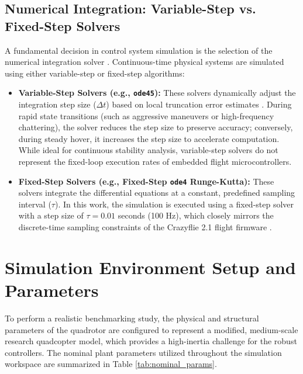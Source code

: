 \subsection{Numerical Integration: Variable-Step vs. Fixed-Step Solvers}
A fundamental decision in control system simulation is the selection of the numerical integration solver \cite{ref_83}. Continuous-time physical systems are simulated using either variable-step or fixed-step algorithms:
\begin{itemize}
    \item \textbf{Variable-Step Solvers (e.g., \texttt{ode45}):} These solvers dynamically adjust the integration step size ($\Delta t$) based on local truncation error estimates \cite{ref_83}. During rapid state transitions (such as aggressive maneuvers or high-frequency chattering), the solver reduces the step size to preserve accuracy; conversely, during steady hover, it increases the step size to accelerate computation. While ideal for continuous stability analysis, variable-step solvers do not represent the fixed-loop execution rates of embedded flight microcontrollers.
    \item \textbf{Fixed-Step Solvers (e.g., Fixed-Step \texttt{ode4} Runge-Kutta):} These solvers integrate the differential equations at a constant, predefined sampling interval ($\tau$). In this work, the simulation is executed using a fixed-step solver with a step size of $\tau = 0.01$ seconds (100 Hz), which closely mirrors the discrete-time sampling constraints of the Crazyflie 2.1 flight firmware \cite{ref_83}.
\end{itemize}

\section{Simulation Environment Setup and Parameters}
To perform a realistic benchmarking study, the physical and structural parameters of the quadrotor are configured to represent a modified, medium-scale research quadcopter model, which provides a high-inertia challenge for the robust controllers. The nominal plant parameters utilized throughout the simulation workspace are summarized in Table \ref{tab:nominal_params}.

